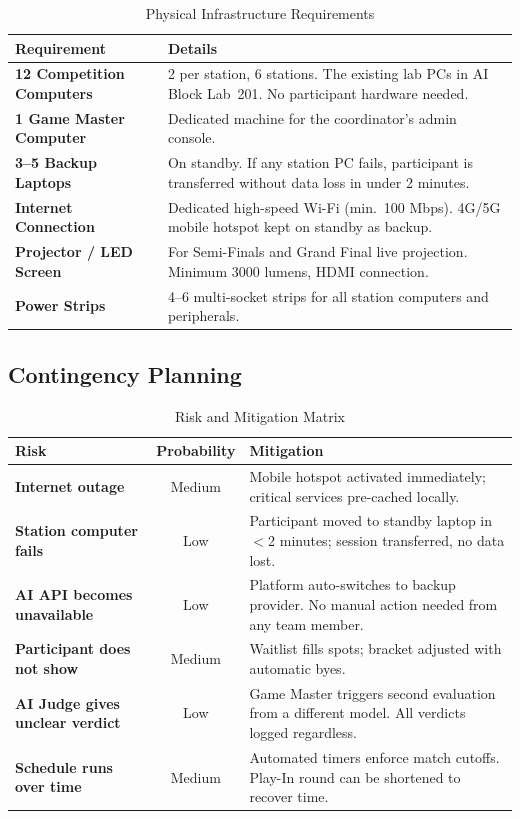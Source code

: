 \documentclass[11pt, a4paper]{article}
\begin{document}
\begin{table}[H]
\centering
\renewcommand{\arraystretch}{1.3}
\begin{tabularx}{\textwidth}{>{\bfseries}l X}
\toprule
Requirement & Details \\
\midrule
12 Competition Computers & 2 per station, 6 stations. The existing lab PCs in AI Block Lab~201. No participant hardware needed. \\
1 Game Master Computer   & Dedicated machine for the coordinator's admin console. \\
3--5 Backup Laptops      & On standby. If any station PC fails, participant is transferred without data loss in under 2 minutes. \\
Internet Connection      & Dedicated high-speed Wi-Fi (min.\ 100 Mbps). 4G/5G mobile hotspot kept on standby as backup. \\
Projector / LED Screen   & For Semi-Finals and Grand Final live projection. Minimum 3000 lumens, HDMI connection. \\
Power Strips             & 4--6 multi-socket strips for all station computers and peripherals. \\
\bottomrule
\end{tabularx}
\caption{Physical Infrastructure Requirements}
\end{table}

\subsection{Contingency Planning}

\begin{table}[H]
\centering
\renewcommand{\arraystretch}{1.3}
\begin{tabularx}{\textwidth}{>{\bfseries}l c X}
\toprule
Risk & Probability & Mitigation \\
\midrule
Internet outage            & Medium & Mobile hotspot activated immediately; critical services pre-cached locally. \\
Station computer fails     & Low    & Participant moved to standby laptop in $<$2 minutes; session transferred, no data lost. \\
AI API becomes unavailable & Low    & Platform auto-switches to backup provider. No manual action needed from any team member. \\
Participant does not show  & Medium & Waitlist fills spots; bracket adjusted with automatic byes. \\
AI Judge gives unclear verdict & Low & Game Master triggers second evaluation from a different model. All verdicts logged regardless. \\
Schedule runs over time    & Medium & Automated timers enforce match cutoffs. Play-In round can be shortened to recover time. \\
\bottomrule
\end{tabularx}
\caption{Risk and Mitigation Matrix}
\end{table}
\end{document}
